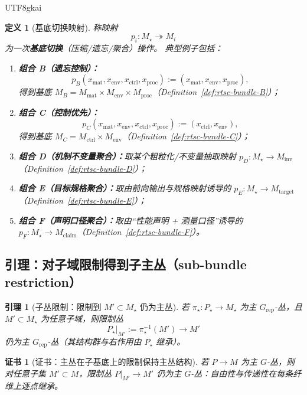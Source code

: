 \documentclass[12pt]{article}
\newtheorem{definition}{定义}[section]
\newtheorem{lemma}{引理}[section]
\newtheorem{certificate}{证书}[section]
\begin{document}
\begin{CJK*}{UTF8}{gkai}
\begin{definition}[基底切换映射]
\label{def:base-switch-map}
称映射
\[
p_i: M_\star \twoheadrightarrow M_i
\]
为一次\textbf{基底切换}（压缩/遗忘/聚合）操作。
典型例子包括：
\begin{enumerate}
  \item \textbf{组合 B（遗忘控制）：}
  \[
  p_B(x_{\mathrm{mat}},x_{\mathrm{env}},x_{\mathrm{ctrl}},x_{\mathrm{proc}})
  :=
  (x_{\mathrm{mat}},x_{\mathrm{env}},x_{\mathrm{proc}}),
  \]
  得到基底 $M_B=M_{\mathrm{mat}}\times M_{\mathrm{env}}\times M_{\mathrm{proc}}$（Definition~\ref{def:rtsc-bundle-B}）；
  \item \textbf{组合 C（控制优先）：}
  \[
  p_C(x_{\mathrm{mat}},x_{\mathrm{env}},x_{\mathrm{ctrl}},x_{\mathrm{proc}})
  :=
  (x_{\mathrm{ctrl}},x_{\mathrm{env}}),
  \]
  得到基底 $M_C=M_{\mathrm{ctrl}}\times M_{\mathrm{env}}$（Definition~\ref{def:rtsc-bundle-C}）；
  \item \textbf{组合 D（机制不变量聚合）：}取某个粗粒化/不变量抽取映射 $p_D:M_\star\to M_{\mathrm{inv}}$（Definition~\ref{def:rtsc-bundle-D}）；
  \item \textbf{组合 E（目标规格聚合）：}取由前向输出与规格映射诱导的 $p_E:M_\star\to M_{\mathrm{target}}$（Definition~\ref{def:rtsc-bundle-E}）；
  \item \textbf{组合 F（声明口径聚合）：}取由“性能声明 + 测量口径”诱导的 $p_F:M_\star\to M_{\mathrm{claim}}$（Definition~\ref{def:rtsc-bundle-F}）。

\end{enumerate}
\end{definition}

\subsection{引理：对子域限制得到子主丛（sub-bundle restriction）}

\begin{lemma}[子丛限制：限制到 $M'\subset M_\star$ 仍为主丛]
\label{lem:subbundle-restriction}
若 $\pi_\star:P_\star\to M_\star$ 为主 $G_{\mathrm{rep}}$-丛，且 $M'\subset M_\star$ 为任意子域，则限制丛
\[
P_\star|_{M'}:=\pi_\star^{-1}(M')\to M'
\]
仍为主 $G_{\mathrm{rep}}$-丛（其结构群与右作用由 $P_\star$ 继承）。
\end{lemma}

\begin{certificate}[证书：主丛在子基底上的限制保持主丛结构]
\label{cert:subbundle-restriction}
若 $P\to M$ 为主 $G$-丛，则对任意子集 $M'\subset M$，限制丛 $P|_{M'}\to M'$ 仍为主 $G$-丛：自由性与传递性在每条纤维上逐点继承。
\end{certificate}


\end{CJK*}
\end{document}

